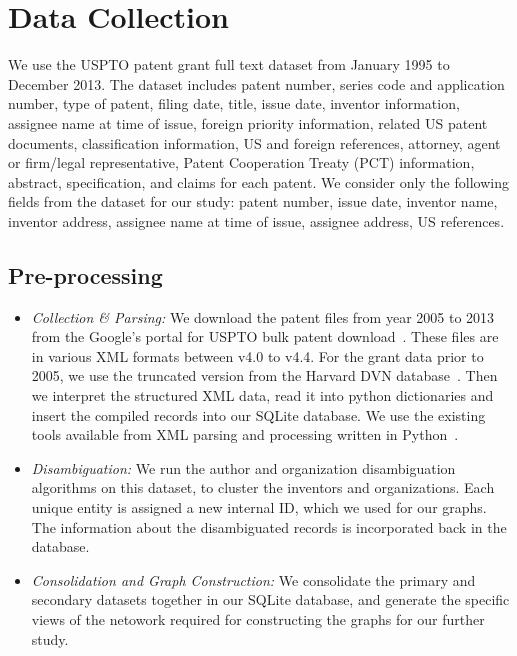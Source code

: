 \section{Data Collection}

We use the USPTO patent grant full text dataset from January 1995 to December 
2013.  The dataset includes patent number, series code and application number,
type of patent, filing date, title, issue date, inventor information, assignee
name at time of issue, foreign priority information, related US patent
documents, classification information, US and foreign references, attorney,
agent or firm/legal representative, Patent Cooperation Treaty (PCT)
information, abstract, specification, and claims for each patent. We consider
only the following fields from the dataset for our study: patent number, issue
date, inventor name, inventor address, assignee name at time of issue, assignee address, US
references. 


\subsection{Pre-processing}

\begin{itemize}
\squish
\item {\em Collection \& Parsing:} We download the patent files from year 2005 to 2013 from the Google's portal for USPTO bulk patent download~\cite{usptodb}. These files are in various XML formats between v4.0 to v4.4. For the grant data prior to 2005, we use the truncated version from the Harvard DVN database~\cite{dvn}. Then we interpret the structured XML data, read it into python dictionaries and insert the compiled records into our SQLite database. We use the existing tools available from XML parsing and processing written in Python~\cite{newparser, formattingpatentdata, fungpaper}. 

\item {\em Disambiguation:} We run the author and organization disambiguation algorithms on this dataset, to cluster the inventors and organizations. Each unique entity is assigned a new internal ID, which we used for our graphs. The information about the disambiguated records is incorporated back in the database. 

\item {\em Consolidation and Graph Construction:} 
We consolidate the primary and secondary datasets together in our SQLite database, and generate the specific views of the netowork required for constructing the graphs for our further study.
\end{itemize}

